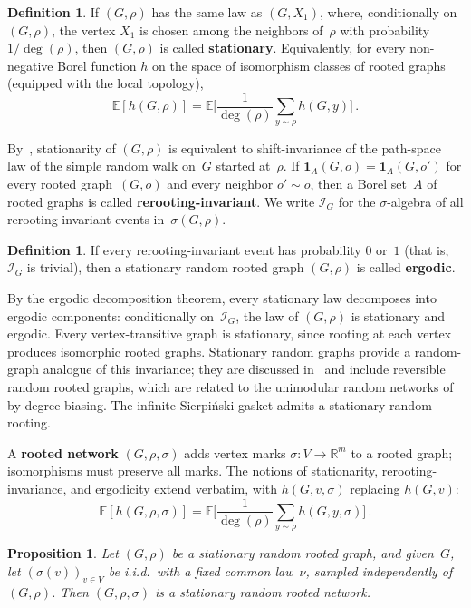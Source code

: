 \documentclass[aop]{imsart}
\theoremstyle{plain}
\newtheorem{proposition}[theorem]{Proposition}
\theoremstyle{definition}
\newtheorem{definition}[theorem]{Definition}
\newcommand{\R}{\mathbb{R}}
\newcommand{\E}{\mathbb{E}}
\newcommand{\one}{\mathbf{1}}
\begin{document}
	\begin{definition}\label{def:stationary-graph}
		If $(G,\rho)$ has the same law as $(G,X_1)$, where, conditionally on $(G,\rho)$, the vertex $X_1$ is chosen among the neighbors of~$\rho$ with probability $1/\deg(\rho)$, then $(G,\rho)$ is called \textbf{stationary}. Equivalently, for every non-negative Borel function $h$ on the space of isomorphism classes of rooted graphs (equipped with the local topology),
		\[
		\E[h(G,\rho)] = \E\biggl[\frac{1}{\deg(\rho)}\sum_{y \sim \rho} h(G,y)\biggr]\,.
		\]
	\end{definition}
	
	By~\citet[Proposition~2.1]{BenjaminiCurien12}, stationarity of $(G,\rho)$ is equivalent to shift-invariance of the path-space law of the simple random walk on~$G$ started at~$\rho$. If $\one_A(G,o)=\one_A(G,o')$ for every rooted graph~$(G,o)$ and every neighbor $o'\sim o$, then a Borel set~$A$ of rooted graphs is called \textbf{rerooting-invariant}. We write $\mathcal{I}_G$ for the $\sigma$-algebra of all rerooting-invariant events in~$\sigma(G,\rho)$.
	
	\begin{definition}\label{def:ergodic-graph}
		If every rerooting-invariant event has probability $0$ or~$1$ (that is, $\mathcal{I}_G$ is trivial), then a stationary random rooted graph $(G,\rho)$ is called \textbf{ergodic}.
	\end{definition}
	
	By the ergodic decomposition theorem, every stationary law decomposes into ergodic components: conditionally on~$\mathcal{I}_G$, the law of $(G,\rho)$ is stationary and ergodic. Every vertex-transitive graph is stationary, since rooting at each vertex produces isomorphic rooted graphs. Stationary random graphs provide a random-graph analogue of this invariance; they are discussed in~\citet{BenjaminiCurien12} and include reversible random rooted graphs, which are related to the unimodular random networks of~\citet{AldousLyons07} by degree biasing. The infinite Sierpi\'nski gasket admits a stationary random rooting.
	
	A \textbf{rooted network} $(G,\rho,\sigma)$ adds vertex marks $\sigma\colon V \to \R^m$ to a rooted graph; isomorphisms must preserve all marks. The notions of stationarity, rerooting-invariance, and ergodicity extend verbatim, with $h(G,v,\sigma)$ replacing $h(G,v)$:
	\[
	\E[h(G,\rho,\sigma)] = \E\biggl[\frac{1}{\deg(\rho)}\sum_{y \sim \rho} h(G,y,\sigma)\biggr]\,.
	\]
	
	\begin{proposition}\label{prop:iid-stationary}
		Let $(G,\rho)$ be a stationary random rooted graph, and given~$G$, let $(\sigma(v))_{v\in V}$ be i.i.d.\ with a fixed common law~$\nu$, sampled independently of~$(G,\rho)$. Then $(G,\rho,\sigma)$ is a stationary random rooted network.
	\end{proposition}
	
\end{document}
